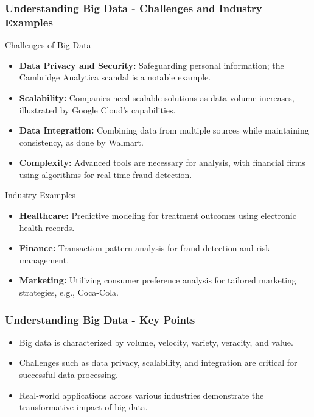 \documentclass[aspectratio=169]{beamer}
\begin{document}
\begin{frame}[fragile]
    \frametitle{Understanding Big Data - Challenges and Industry Examples}
    \begin{block}{Challenges of Big Data}
        \begin{itemize}
            \item \textbf{Data Privacy and Security:} Safeguarding personal information; the Cambridge Analytica scandal is a notable example.
            \item \textbf{Scalability:} Companies need scalable solutions as data volume increases, illustrated by Google Cloud's capabilities.
            \item \textbf{Data Integration:} Combining data from multiple sources while maintaining consistency, as done by Walmart.
            \item \textbf{Complexity:} Advanced tools are necessary for analysis, with financial firms using algorithms for real-time fraud detection.
        \end{itemize}
    \end{block}
    
    \begin{block}{Industry Examples}
        \begin{itemize}
            \item \textbf{Healthcare:} Predictive modeling for treatment outcomes using electronic health records.
            \item \textbf{Finance:} Transaction pattern analysis for fraud detection and risk management.
            \item \textbf{Marketing:} Utilizing consumer preference analysis for tailored marketing strategies, e.g., Coca-Cola.
        \end{itemize}
    \end{block}
\end{frame}

\begin{frame}[fragile]
    \frametitle{Understanding Big Data - Key Points}
    \begin{itemize}
        \item Big data is characterized by volume, velocity, variety, veracity, and value.
        \item Challenges such as data privacy, scalability, and integration are critical for successful data processing.
        \item Real-world applications across various industries demonstrate the transformative impact of big data.
    \end{itemize}
\end{frame}
\end{document}
